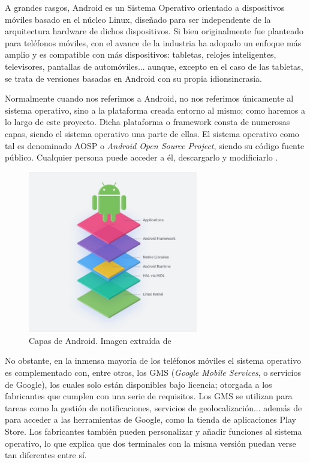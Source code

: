         A grandes rasgos, Android es un Sistema Operativo orientado a dispositivos móviles basado en el núcleo 
        Linux, diseñado para ser independente de la arquitectura hardware de dichos dispositivos. 
        Si bien originalmente fue planteado para teléfonos móviles, con el avance de la industria ha adopado 
        un enfoque más amplio y es compatible con más dispositivos: tabletas, relojes inteligentes, televisores, 
        pantallas de automóviles... aunque, excepto en el caso de las tabletas, se trata de versiones basadas en
        Android con su propia idionsincrasia. 

        Normalmente cuando nos referimos a Android, no nos referimos únicamente al sistema operativo, sino a la
        plataforma creada entorno al mismo; como haremos a lo largo de este proyecto. Dicha plataforma o 
        \gls{framework} consta de numerosas capas, siendo el sistema operativo una parte de ellas. El sistema 
        operativo como tal es denominado AOSP o \textit{Android Open Source Project}, siendo su código fuente 
        público. Cualquier persona puede acceder a él, descargarlo y modificiarlo \cite{collado_que_2022}.

        \begin{figure}[h]
            \centering
            \includegraphics[width=0.66\textwidth]{figures/Android capas.jpg}
            \caption[Capas de Android.]
            {Capas de Android. Imagen extraída de \cite{perez_aosp_2019}}
            \label{figure:android:capas}
        \end{figure}

        No obstante, en la inmensa mayoría de los teléfonos móviles el sistema operativo es complementado con,
        entre otros, los GMS (\textit{Google Mobile Services}, o servicios de Google), los cuales solo están 
        disponibles bajo licencia; otorgada a los fabricantes que cumplen con una serie de requisitos. Los GMS 
        se utilizan para tareas como la gestión de notificaciones, servicios de geolocalización... además de para 
        acceder a las herramientas de Google, como la tienda de aplicaciones Play Store. Los fabricantes también 
        pueden personalizar y añadir funciones al sistema operativo, lo que explica que dos terminales con la misma 
        versión puedan verse tan diferentes entre sí. 
        

